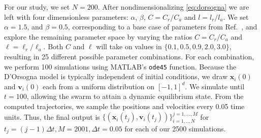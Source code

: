 \documentclass[%
 aip,
reprint,
 amsmath,amssymb,
 aps,
showkeys
]{revtex4-1}
\begin{document}
For our study, we set $N=200$. After nondimensionalizing \eqref{eq:dorsogna} we are left with four dimensionless parameters: $\alpha$, $\beta$, $C=C_r/C_a$ and $l=l_r/l_a$. We set $\alpha=1.5$, and $\beta=0.5$, corresponding to a base case of parameters from Ref.~, and explore the remaining parameter space by varying the ratios $C = C_r/C_a$ and $\ell = \ell_r/\ell_a$. Both $C$ and $\ell$ will take on values in $\{0.1,0.5,0.9,2.0,3.0\}$, resulting in 25 different possible parameter combinations. For each combination, we perform 100 simulations using M{\sc ATLAB}'s \texttt{ode45} function. Because the D'Orsogna model is typically independent of initial conditions, we draw $\mathbf{x}_{i}(0)$ and $\mathbf{v}_{i}(0)$ each from a uniform distribution on $[-1,1]^d$.  We simulate until $t=100$, allowing the swarm to attain a dynamic equilibrium state. From the computed trajectories, we sample the positions and velocities every 0.05 time units. Thus, the final output is $\{(\boldsymbol{x}_i(t_j),\boldsymbol{v}_i(t_j))\}_{i=1,..,N}^{j=1,...,M}$ for $t_j= (j-1)\Delta t, M=2001, \Delta t =  0.05$ for each of our 2500 simulations.
\end{document}

